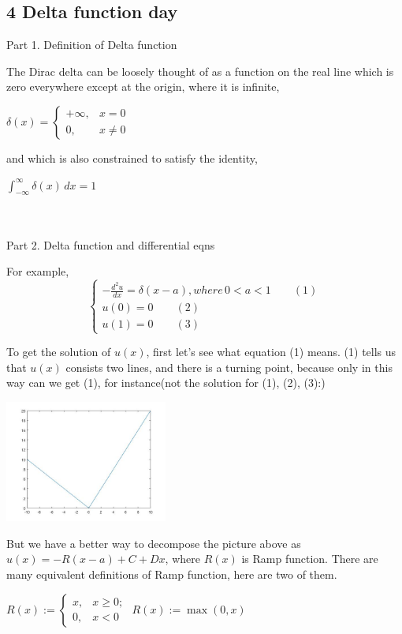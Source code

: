 \documentclass{article}
\newenvironment{nscenter}
{\parskip=0pt\par\nopagebreak\centering}
{\par\noindent\ignorespacesafterend}
\begin{document}
\begin{spacing}{1.5}
\section*{4 Delta function day}
Part 1. Definition of Delta function

The Dirac delta can be loosely thought of as a function on the real line which is zero everywhere except at the origin, where it is infinite,
\begin{nscenter}
${\displaystyle \delta (x)={\begin{cases}+\infty ,&x=0\\0,&x\neq 0\end{cases}}}$
\end{nscenter}
and which is also constrained to satisfy the identity,
\begin{nscenter}
	${\displaystyle \int _{-\infty }^{\infty }\delta (x)\,dx=1}$
\end{nscenter}
\\\\Part 2. Delta function and differential eqns

For example, 
$$
\begin{cases}
-\frac{d^2u}{dx}=\delta(x-a), where \, 0 < a < 1 \qquad (1)\\
u(0)=0 \qquad (2)\\
u(1)=0 \qquad (3)
\end{cases}$$

To get the solution of $u(x)$, first let's see what equation (1) means. (1) tells us that $u(x)$ consists two lines, and there is a turning point, because only in this way can we get (1), for instance(not the solution for (1), (2), (3):)
\\\begin{center}
	\includegraphics[width=0.4\textwidth]{piecewise_func.jpg} \\ 
\end{center}

But we have a better way to decompose the picture above as $u(x) = -R(x-a) + C + Dx$, where $R(x)$ is Ramp function. There are many equivalent definitions of Ramp function, here are two of them. 
\begin{nscenter}
	$R(x):={\begin{cases}x,&x\geq 0;\\0,&x<0\end{cases}}$ \qquad ${\displaystyle R(x):=\operatorname {max} (0, x)} $
\end{nscenter}


\end{spacing}
\end{document}

